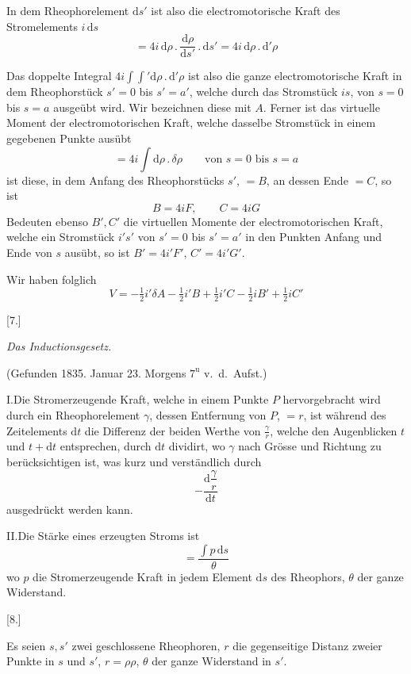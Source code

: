 In dem Rheophorelement $\mathrm ds'$ ist also die electromotorische Kraft des Stromelements $i\,\mathrm ds$
\[
=4i\,\mathrm d\rho\,.\,\frac{\mathrm d\rho}{\mathrm ds'}\,.\,\mathrm ds'=4i\,\mathrm d\rho\,.\,\mathrm d'\rho
\]

Das doppelte Integral $4i\int\int'\mathrm d\rho\,.\,\mathrm d'\rho$ ist also die ganze electromotorische Kraft in dem Rheophorstück $s'=0$ bis $s'=a'$, welche durch das Stromstück $is$, von $s=0$ bis $s=a$ ausgeübt wird. Wir bezeichnen diese mit $A$. Ferner ist das virtuelle Moment der electromotorischen Kraft, welche dasselbe Stromstück in einem gegebenen Punkte ausübt
\[
=4i\int\mathrm d\rho\,.\,\delta\rho\qquad\text{von }s=0\text{ bis }s=a
\]
ist diese, in dem Anfang des Rheophorstücks $s'$, $=B$, an dessen Ende $=C$, so ist
\[
B=4iF,\qquad C=4iG
\]
Bedeuten ebenso $B',C'$ die virtuellen Momente der electromotorischen Kraft, welche ein Stromstück $i's'$ von $s'=0$ bis $s'=a'$ in den Punkten Anfang und Ende von $s$ ausübt, so ist $B'=4i'F'$, $C'=4i'G'$.

Wir haben folglich
\[
V=-\tfrac{1}{2}i'\delta A-\tfrac{1}{2}i'B+\tfrac{1}{2}i'C-\tfrac{1}{2}iB'+\tfrac{1}{2}iC'
\]

\begin{center}[7.]\par\medskip\textit{Das Inductionsgesetz.}\par\medskip
{\small (Gefunden 1835. Januar 23. Morgens $7^{\mathrm u}$ v.\ d.\ Aufst.)}
\end{center}
I.\quad Die Stromerzeugende Kraft, welche in einem Punkte $P$ hervorgebracht wird durch ein Rheophorelement $\gamma$, dessen Entfernung von $P$, $=r$, ist während des Zeitelements $\mathrm dt$ die Differenz der beiden Werthe von $\frac{\gamma}{r}$, welche den Augenblicken $t$ und $t+\mathrm dt$ entsprechen, durch $\mathrm dt$ dividirt, wo $\gamma$ nach Grösse und Richtung zu berücksichtigen ist, was kurz und verständlich durch
\[
-\frac{\mathrm d\dfrac{\gamma}{r}}{\mathrm dt}
\]
ausgedrückt werden kann.

II.\quad Die Stärke eines erzeugten Stroms ist
\[
=\frac{\int p\,\mathrm ds}{\theta}
\]
wo $p$ die Stromerzeugende Kraft in jedem Element $\mathrm ds$ des Rheophors, $\theta$ der ganze Widerstand.

\begin{center}[8.]\end{center}
Es seien $s,s'$ zwei geschlossene Rheophoren, $r$ die gegenseitige Distanz zweier Punkte in $s$ und $s'$, $r=\rho\rho$, $\theta$ der ganze Widerstand in $s'$.

